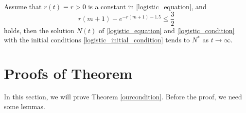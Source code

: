\documentclass{HZNUMCM}
\begin{document}
\begin{corollary}\label{cor1}
Assume that $r(t)\equiv r>0$ is a constant in \eqref{logistic_equation}, and
\begin{equation}\label{ourcondition_eq_r}
r(m+1)-e^{-r(m+1)-1.5}\leqslant\frac 3 2
\end{equation}
holds, then the solution $N(t)$ of \eqref{logistic_equation} and \eqref{logistic_condition}  with the initial conditions \eqref{logistic_initial_condition}  tends to $N^*$ as $t\rightarrow\infty$.
\end{corollary}



\section{Proofs of Theorem}
In this section, we will prove Theorem \ref{ourcondition}. Before the proof, we need some lemmas.
\end{document}
